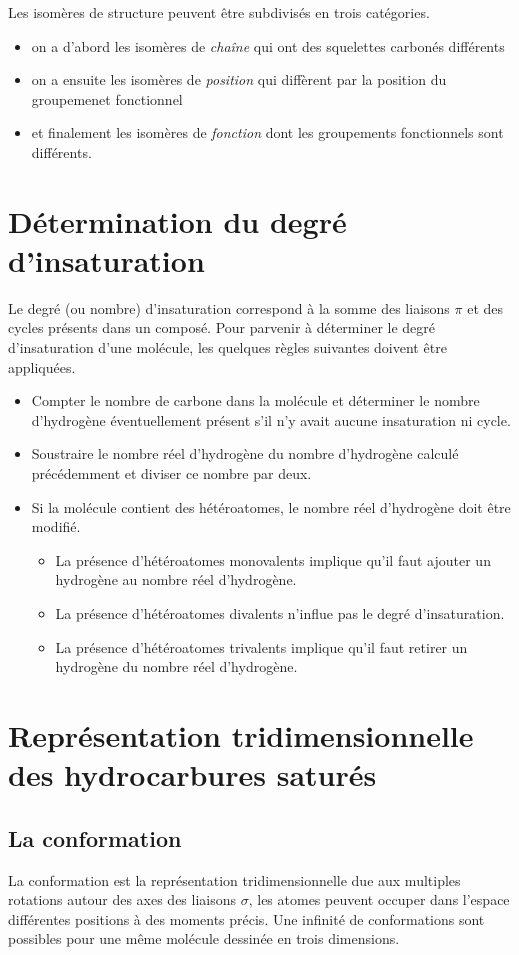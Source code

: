 Les isomères de structure peuvent être subdivisés en trois catégories.
\begin{itemize}
  \item on a d'abord les isomères de \emph{cha\^ine} qui ont des squelettes carbonés différents
  \item on a ensuite les isomères de \emph{position} qui diffèrent par la position du groupemenet fonctionnel
  \item et finalement les isomères de \emph{fonction} dont les groupements fonctionnels sont différents.
\end{itemize}

\section{Détermination du degré d'insaturation}
Le degré (ou nombre) d'insaturation correspond à la somme des liaisons $\pi$ 
et des cycles présents dans un composé.
Pour parvenir à déterminer le degré d'insaturation d'une molécule, les quelques règles suivantes doivent être appliquées.
\begin{itemize}
  \item Compter le nombre de carbone dans la molécule et déterminer le nombre d'hydrogène éventuellement présent s'il n'y avait aucune insaturation ni cycle.
  \item Soustraire le nombre réel d'hydrogène du nombre d'hydrogène calculé précédemment et  diviser ce nombre par deux.
  \item Si la molécule contient des hétéroatomes, le nombre réel d'hydrogène doit être modifié.
    \begin{itemize}
      \item La présence d'hétéroatomes monovalents implique qu'il faut ajouter un hydrogène au nombre réel d'hydrogène.
      \item La présence d'hétéroatomes divalents n'influe pas le degré d'insaturation.
      \item La présence d'hétéroatomes trivalents implique qu'il faut retirer un hydrogène du nombre réel d'hydrogène.
    \end{itemize}
\end{itemize}

\section{Représentation tridimensionnelle des hydrocarbures saturés}

\subsection{La conformation}
La conformation est la représentation tridimensionnelle due aux multiples rotations autour des axes des liaisons $\sigma$, les atomes peuvent occuper dans l'espace différentes positions à des moments précis.
Une infinité de conformations sont possibles pour une même molécule dessinée en trois dimensions.

